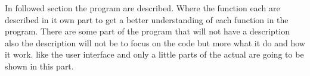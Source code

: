 In followed section the program are described. Where the function each are described in it own part to get a better understanding of each function in the program. There are some part of the program that will not have a description also the description will not be to focus on the code but more what it do and how it work. like the user interface and only a little parts of the actual are going to be shown in this part.